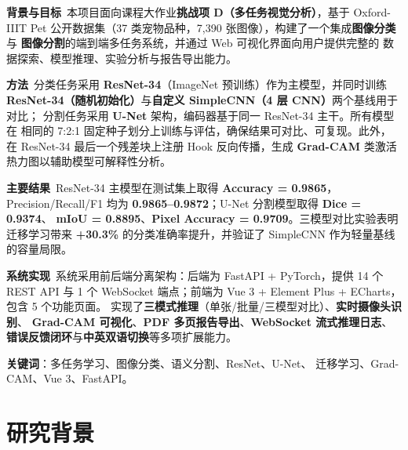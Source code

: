 \documentclass[12pt, a4paper, openany]{ctexbook}
\begin{document}
\begin{abstractbox}
\noindent \textbf{背景与目标}\ 
本项目面向课程大作业\textbf{挑战项 D（多任务视觉分析）}，基于 Oxford-IIIT Pet
公开数据集（37 类宠物品种，7{,}390 张图像），构建了一个集成\textbf{图像分类}与
\textbf{图像分割}的端到端多任务系统，并通过 Web 可视化界面向用户提供完整的
数据探索、模型推理、实验分析与报告导出能力。

\vspace{0.3em}
\noindent \textbf{方法}\ 
分类任务采用 \textbf{ResNet-34}（ImageNet 预训练）作为主模型，并同时训练
\textbf{ResNet-34（随机初始化）}与\textbf{自定义 SimpleCNN（4 层 CNN）}两个基线用于对比；
分割任务采用 \textbf{U-Net} 架构，编码器基于同一 ResNet-34 主干。所有模型在
相同的 7:2:1 固定种子划分上训练与评估，确保结果可对比、可复现。此外，在
ResNet-34 最后一个残差块上注册 Hook 反向传播，生成 \textbf{Grad-CAM}
类激活热力图以辅助模型可解释性分析。

\vspace{0.3em}
\noindent \textbf{主要结果}\ 
ResNet-34 主模型在测试集上取得 \textbf{Accuracy = 0.9865}，Precision/Recall/F1
均为 \textbf{0.9865--0.9872}；U-Net 分割模型取得 \textbf{Dice = 0.9374}、
\textbf{mIoU = 0.8895}、\textbf{Pixel Accuracy = 0.9709}。三模型对比实验表明
迁移学习带来 \textbf{+30.3\%} 的分类准确率提升，并验证了 SimpleCNN
作为轻量基线的容量局限。

\vspace{0.3em}
\noindent \textbf{系统实现}\ 
系统采用前后端分离架构：后端为 FastAPI + PyTorch，提供 14 个 REST API 与 1 个
WebSocket 端点；前端为 Vue 3 + Element Plus + ECharts，包含 5 个功能页面。
实现了\textbf{三模式推理}（单张/批量/三模型对比）、\textbf{实时摄像头识别}、
\textbf{Grad-CAM 可视化}、\textbf{PDF 多页报告导出}、\textbf{WebSocket 流式推理日志}、
\textbf{错误反馈闭环}与\textbf{中英双语切换}等多项扩展能力。

\vspace{0.3em}
\noindent \textbf{关键词}：多任务学习、图像分类、语义分割、ResNet、U-Net、
迁移学习、Grad-CAM、Vue 3、FastAPI。
\end{abstractbox}

\tableofcontents
\thispagestyle{empty}
\cleardoublepage

\setcounter{page}{1}

\chapter{研究背景}
\end{document}
